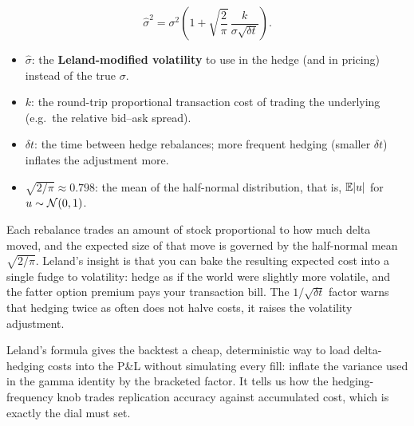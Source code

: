 \begin{equation}
\label{eq:ivrv:leland-vol}
\hat{\sigma}^2 = \sigma^2\left(1 + \sqrt{\frac{2}{\pi}}\,\frac{k}{\sigma\sqrt{\delta t}}\right).
\end{equation}
\begin{itemize}
  \item $\hat{\sigma}$: the \textbf{Leland-modified volatility} to use in the hedge (and in pricing) instead of the true $\sigma$.
  \item $k$: the round-trip proportional transaction cost of trading the underlying (e.g.\ the relative bid--ask spread).
  \item $\delta t$: the time between hedge rebalances; more frequent hedging (smaller $\delta t$) inflates the adjustment more.
  \item $\sqrt{2/\pi} \approx 0.798$: the mean of the half-normal distribution, that is, $\mathbb{E}|u|$ for $u \sim \mathcal{N}(0,1)$.
\end{itemize}

\begin{intuition}
Each rebalance trades an amount of stock proportional to how much delta moved, and the expected size of that move is governed by the half-normal mean $\sqrt{2/\pi}$. Leland's insight is that you can bake the resulting expected cost into a single fudge to volatility: hedge as if the world were slightly more volatile, and the fatter option premium pays your transaction bill. The $1/\sqrt{\delta t}$ factor warns that hedging twice as often does not halve costs, it raises the volatility adjustment.
\end{intuition}

\begin{projectconnection}
Leland's formula gives the backtest a cheap, deterministic way to load delta-hedging costs into the P\&L without simulating every fill: inflate the variance used in the gamma identity by the bracketed factor. It tells us how the hedging-frequency knob trades replication accuracy against accumulated cost, which is exactly the dial  must set.
\end{projectconnection}

